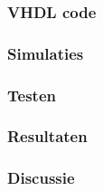 \subsubsection{VHDL code}

\subsubsection{Simulaties}

\subsubsection{Testen}

\subsubsection{Resultaten}

\subsubsection{Discussie}